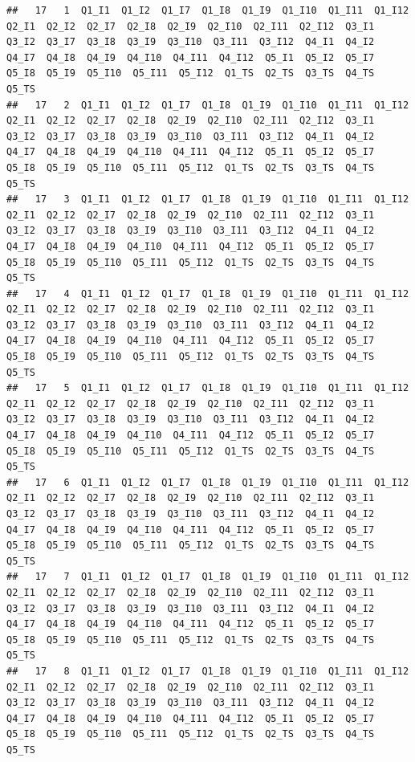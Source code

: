 \documentclass[
]{book}
\begin{document}
\begin{verbatim}
##   17   1  Q1_I1  Q1_I2  Q1_I7  Q1_I8  Q1_I9  Q1_I10  Q1_I11  Q1_I12  Q2_I1  Q2_I2  Q2_I7  Q2_I8  Q2_I9  Q2_I10  Q2_I11  Q2_I12  Q3_I1  Q3_I2  Q3_I7  Q3_I8  Q3_I9  Q3_I10  Q3_I11  Q3_I12  Q4_I1  Q4_I2  Q4_I7  Q4_I8  Q4_I9  Q4_I10  Q4_I11  Q4_I12  Q5_I1  Q5_I2  Q5_I7  Q5_I8  Q5_I9  Q5_I10  Q5_I11  Q5_I12  Q1_TS  Q2_TS  Q3_TS  Q4_TS  Q5_TS
##   17   2  Q1_I1  Q1_I2  Q1_I7  Q1_I8  Q1_I9  Q1_I10  Q1_I11  Q1_I12  Q2_I1  Q2_I2  Q2_I7  Q2_I8  Q2_I9  Q2_I10  Q2_I11  Q2_I12  Q3_I1  Q3_I2  Q3_I7  Q3_I8  Q3_I9  Q3_I10  Q3_I11  Q3_I12  Q4_I1  Q4_I2  Q4_I7  Q4_I8  Q4_I9  Q4_I10  Q4_I11  Q4_I12  Q5_I1  Q5_I2  Q5_I7  Q5_I8  Q5_I9  Q5_I10  Q5_I11  Q5_I12  Q1_TS  Q2_TS  Q3_TS  Q4_TS  Q5_TS
##   17   3  Q1_I1  Q1_I2  Q1_I7  Q1_I8  Q1_I9  Q1_I10  Q1_I11  Q1_I12  Q2_I1  Q2_I2  Q2_I7  Q2_I8  Q2_I9  Q2_I10  Q2_I11  Q2_I12  Q3_I1  Q3_I2  Q3_I7  Q3_I8  Q3_I9  Q3_I10  Q3_I11  Q3_I12  Q4_I1  Q4_I2  Q4_I7  Q4_I8  Q4_I9  Q4_I10  Q4_I11  Q4_I12  Q5_I1  Q5_I2  Q5_I7  Q5_I8  Q5_I9  Q5_I10  Q5_I11  Q5_I12  Q1_TS  Q2_TS  Q3_TS  Q4_TS  Q5_TS
##   17   4  Q1_I1  Q1_I2  Q1_I7  Q1_I8  Q1_I9  Q1_I10  Q1_I11  Q1_I12  Q2_I1  Q2_I2  Q2_I7  Q2_I8  Q2_I9  Q2_I10  Q2_I11  Q2_I12  Q3_I1  Q3_I2  Q3_I7  Q3_I8  Q3_I9  Q3_I10  Q3_I11  Q3_I12  Q4_I1  Q4_I2  Q4_I7  Q4_I8  Q4_I9  Q4_I10  Q4_I11  Q4_I12  Q5_I1  Q5_I2  Q5_I7  Q5_I8  Q5_I9  Q5_I10  Q5_I11  Q5_I12  Q1_TS  Q2_TS  Q3_TS  Q4_TS  Q5_TS
##   17   5  Q1_I1  Q1_I2  Q1_I7  Q1_I8  Q1_I9  Q1_I10  Q1_I11  Q1_I12  Q2_I1  Q2_I2  Q2_I7  Q2_I8  Q2_I9  Q2_I10  Q2_I11  Q2_I12  Q3_I1  Q3_I2  Q3_I7  Q3_I8  Q3_I9  Q3_I10  Q3_I11  Q3_I12  Q4_I1  Q4_I2  Q4_I7  Q4_I8  Q4_I9  Q4_I10  Q4_I11  Q4_I12  Q5_I1  Q5_I2  Q5_I7  Q5_I8  Q5_I9  Q5_I10  Q5_I11  Q5_I12  Q1_TS  Q2_TS  Q3_TS  Q4_TS  Q5_TS
##   17   6  Q1_I1  Q1_I2  Q1_I7  Q1_I8  Q1_I9  Q1_I10  Q1_I11  Q1_I12  Q2_I1  Q2_I2  Q2_I7  Q2_I8  Q2_I9  Q2_I10  Q2_I11  Q2_I12  Q3_I1  Q3_I2  Q3_I7  Q3_I8  Q3_I9  Q3_I10  Q3_I11  Q3_I12  Q4_I1  Q4_I2  Q4_I7  Q4_I8  Q4_I9  Q4_I10  Q4_I11  Q4_I12  Q5_I1  Q5_I2  Q5_I7  Q5_I8  Q5_I9  Q5_I10  Q5_I11  Q5_I12  Q1_TS  Q2_TS  Q3_TS  Q4_TS  Q5_TS
##   17   7  Q1_I1  Q1_I2  Q1_I7  Q1_I8  Q1_I9  Q1_I10  Q1_I11  Q1_I12  Q2_I1  Q2_I2  Q2_I7  Q2_I8  Q2_I9  Q2_I10  Q2_I11  Q2_I12  Q3_I1  Q3_I2  Q3_I7  Q3_I8  Q3_I9  Q3_I10  Q3_I11  Q3_I12  Q4_I1  Q4_I2  Q4_I7  Q4_I8  Q4_I9  Q4_I10  Q4_I11  Q4_I12  Q5_I1  Q5_I2  Q5_I7  Q5_I8  Q5_I9  Q5_I10  Q5_I11  Q5_I12  Q1_TS  Q2_TS  Q3_TS  Q4_TS  Q5_TS
##   17   8  Q1_I1  Q1_I2  Q1_I7  Q1_I8  Q1_I9  Q1_I10  Q1_I11  Q1_I12  Q2_I1  Q2_I2  Q2_I7  Q2_I8  Q2_I9  Q2_I10  Q2_I11  Q2_I12  Q3_I1  Q3_I2  Q3_I7  Q3_I8  Q3_I9  Q3_I10  Q3_I11  Q3_I12  Q4_I1  Q4_I2  Q4_I7  Q4_I8  Q4_I9  Q4_I10  Q4_I11  Q4_I12  Q5_I1  Q5_I2  Q5_I7  Q5_I8  Q5_I9  Q5_I10  Q5_I11  Q5_I12  Q1_TS  Q2_TS  Q3_TS  Q4_TS  Q5_TS

\end{verbatim}
\end{document}
